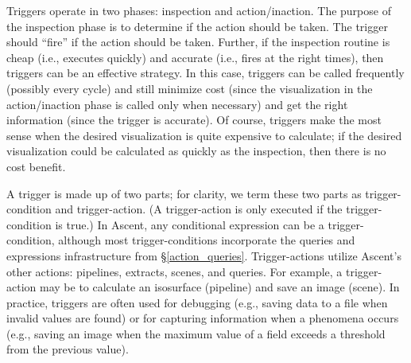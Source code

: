 Triggers operate in two phases: inspection and action/inaction.
%
The purpose of the inspection phase is to determine if the action should be taken.
%
The trigger should ``fire'' if the action should be taken.
%
Further, if the inspection routine is cheap (i.e., executes quickly) and accurate (i.e.,
fires at the right times), then
triggers can be an effective strategy.
%
In this case, triggers can be called frequently (possibly every cycle) and still minimize cost
(since the visualization in the action/inaction phase is called only when necessary) and
get the right information (since the trigger is accurate).
%
Of course, triggers make the most sense when the desired visualization is quite expensive
to calculate;
if the desired visualization could be calculated as quickly as the inspection,
then there is no cost benefit.





%
%
%
%

A trigger is made up of two parts; for clarity, we term these two parts
as trigger-condition and trigger-action.
(A trigger-action is only executed if the trigger-condition is true.)
%
In Ascent, any conditional expression can be a trigger-condition, although most trigger-conditions
incorporate the queries and expressions infrastructure from
\S\ref{action_queries}.
%
Trigger-actions utilize Ascent's other actions: pipelines, extracts, scenes, and
queries.
%
For example, a trigger-action may be to calculate an isosurface (pipeline) and save
an image (scene).
%
In practice, triggers are often used for debugging (e.g., saving data to
a file when invalid values are found) or
for capturing information when a phenomena occurs
(e.g., saving an image when the maximum value of a field exceeds a threshold from the
previous value).
%

